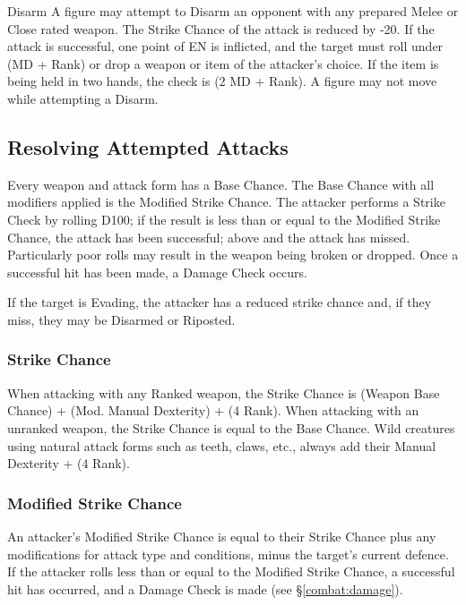 \begin{multicols*}{3}
\begin{Description}
\item[Disarm] A figure may attempt to Disarm an opponent with any
prepared Melee or Close rated weapon. The Strike Chance of the attack
is reduced by -20. If the attack is successful, one point of EN is
inflicted, and the target must roll under (MD + Rank) or drop a weapon
or item of the attacker's choice. If the item is being held in two
hands, the check is (2 \x MD + Rank). A figure may not move while
attempting a Disarm.

\end{Description}

\subsection{Resolving Attempted Attacks}

Every weapon and attack form has a Base Chance. The Base Chance with
all modifiers applied is the Modified Strike Chance. The attacker
performs a Strike Check by rolling D100; if the result is less than or
equal to the Modified Strike Chance, the attack has been successful;
above and the attack has missed. Particularly poor rolls may result in
the weapon being broken or dropped. Once a successful hit has been
made, a Damage Check occurs.

If the target is Evading, the attacker has a reduced strike chance
and, if they miss, they may be Disarmed or Riposted.

\subsubsection{Strike Chance}

When attacking with any Ranked weapon, the Strike Chance is (Weapon
Base Chance) + (Mod. Manual Dexterity) + (4 \x Rank). When attacking with
an unranked weapon, the Strike Chance is equal to the Base
Chance. Wild creatures using natural attack forms such as teeth,
claws, etc., always add their Manual Dexterity + (4 \x Rank).

\subsubsection{Modified Strike Chance}

An attacker's Modified Strike Chance is equal to their Strike Chance
plus any modifications for attack type and conditions, minus the
target's current defence. If the attacker rolls less than or equal to
the Modified Strike Chance, a successful hit has occurred, and a
Damage Check is made (see \S \ref{combat:damage}).


\end{multicols*}
